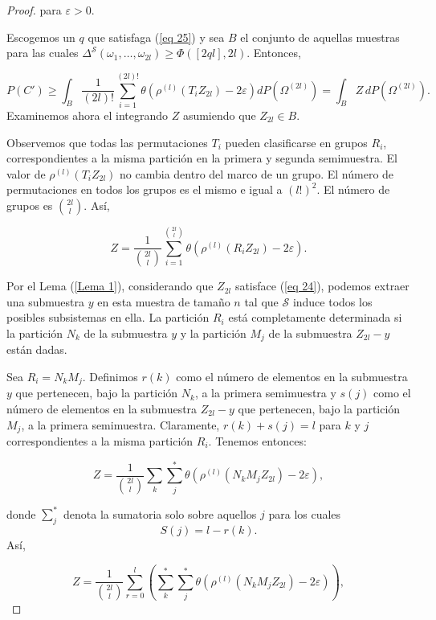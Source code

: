 \documentclass{report}
\begin{document}
\begin{proof}
para \( \varepsilon > 0 \).

Escogemos un \( q \) que satisfaga (\ref{eq 25}) y sea \( B \) el conjunto de aquellas muestras para las cuales
\( \Delta^{\mathcal{S}}(\omega_1, \dots, \omega_{2l}) \geq \Phi([ 2ql ], 2l) \). Entonces,

\begin{equation*}
P(C') \geq \int_B \frac{1}{(2l)!} \sum_{i=1}^{(2l)!} \theta \left( \rho^{(l)} (T_i Z_{2l}) - 2\varepsilon \right) dP(\Omega^{(2l)})
= \int_B Z \, dP(\Omega^{(2l)}).
\end{equation*}
Examinemos ahora el integrando \( Z \) asumiendo que \( Z_{2l} \in B \).

Observemos que todas las permutaciones \( T_i \) pueden clasificarse en grupos \( R_i \),
correspondientes a la misma partición en la primera y segunda semimuestra.
El valor de \( \rho^{(l)} (T_i Z_{2l}) \) no cambia dentro del marco de un grupo.
El número de permutaciones en todos los grupos es el mismo e igual a \( (l!)^2 \).
El número de grupos es \( \binom{2l}{l} \). Así,

\[
Z = \frac{1}{\binom{2l}{l}} \sum_{i=1}^{\binom{2l}{l}} \theta ( \rho^{(l)} (R_i Z_{2l}) - 2\varepsilon ).
\]

Por el Lema (\ref{Lema 1}), considerando que \( Z_{2l} \) satisface (\ref{eq 24}), podemos extraer una submuestra \( y \)
en esta muestra de tamaño \( n \) tal que \( \mathcal{S} \) induce todos los posibles subsistemas en ella.
La partición \( R_i \) está completamente determinada si la partición \( N_k \) de la submuestra \( y \)
y la partición \( M_j \) de la submuestra \( Z_{2l} - y \) están dadas.

Sea \( R_i = N_k M_j \). Definimos \( r(k) \) como el número de elementos en la submuestra \( y \) que pertenecen,
bajo la partición \( N_k \), a la primera semimuestra y \( s(j) \) como el número de elementos en la submuestra
\( Z_{2l} - y \) que pertenecen, bajo la partición \( M_j \), a la primera semimuestra.
Claramente, \( r(k) + s(j) = l \) para \( k \) y \( j \) correspondientes a la misma partición \( R_i \).
Tenemos entonces:

\[
Z = \frac{1}{\binom{2l}{l}} \sum_k \sum_j^* \theta ( \rho^{(l)} (N_k M_j Z_{2l}) - 2\varepsilon ),
\]

donde \( \displaystyle\sum_j^* \) denota la sumatoria solo sobre aquellos \( j \) para los cuales
\[
S(j) = l - r(k).
\]
Así,

\[
Z = \frac{1}{\binom{2l}{l}} \sum_{r=0}^{l} \left( \sum_k^* \sum_j^* \theta ( \rho^{(l)} (N_k M_j Z_{2l}) - 2\varepsilon ) \right),
\]


\end{proof}
\end{document}

